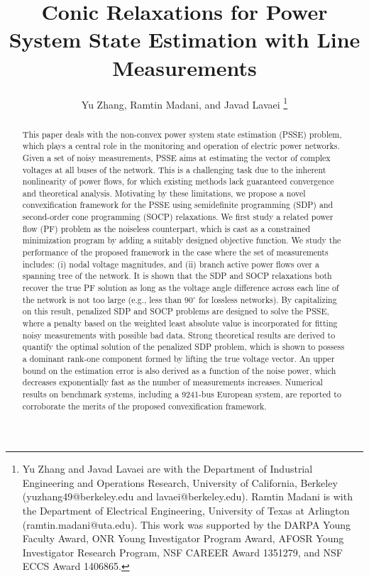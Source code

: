 \documentclass[journal,twoside]{IEEEtran}
\begin{document}
\title{Conic Relaxations for Power System State Estimation with Line Measurements}

\author{Yu Zhang, Ramtin Madani, and Javad Lavaei
\thanks{Yu Zhang and Javad Lavaei are  with the Department of Industrial Engineering and Operations Research,
University of California, Berkeley (yuzhang49@berkeley.edu and lavaei@berkeley.edu).
Ramtin Madani is with the Department of Electrical Engineering, University of Texas at Arlington (ramtin.madani@uta.edu).
This work was supported by the DARPA Young Faculty Award, ONR Young Investigator Program Award,
AFOSR Young Investigator Research Program, NSF CAREER Award 1351279, and NSF ECCS Award 1406865.
}}

\markboth{}%
{}
\maketitle



\begin{abstract}
This paper deals with the non-convex power system state estimation (PSSE) problem,
which plays a central role in the monitoring and operation of electric power networks.
Given a set of noisy measurements, PSSE aims at estimating the vector of complex voltages at all buses of  the network. This is a challenging task due to the inherent nonlinearity of power flows, for which existing methods  lack  guaranteed convergence and theoretical analysis.
Motivating by these limitations, we propose a novel convexification framework for the PSSE using semidefinite programming (SDP) and second-order cone programming (SOCP) relaxations.
We first study a related power flow (PF) problem as the noiseless counterpart, which is cast as a constrained minimization program by adding a suitably designed objective function.
We study the performance of the proposed framework in the case where the set of measurements includes:
(i) nodal voltage magnitudes, and (ii) branch active power flows over a spanning tree of the network.
It is shown that  the SDP and SOCP relaxations both recover the true PF solution
as long as the voltage angle difference across each line of the network is not too large
(e.g., less than $90^{\circ}$ for lossless networks).
By capitalizing on this result, penalized SDP and SOCP problems are designed to solve the PSSE,
where a penalty based on the weighted least absolute value is incorporated for fitting noisy measurements with possible bad data.
Strong theoretical results are derived to quantify the optimal solution of the penalized SDP problem, which is shown to
possess a dominant rank-one component formed by lifting the true voltage vector.
An upper bound on the estimation error is also derived as a function of the noise power,
which decreases exponentially fast as the number of measurements increases.
Numerical results on benchmark systems, including a 9241-bus European system,
are reported to corroborate the merits of the proposed convexification framework.
\end{abstract}
\end{document}
